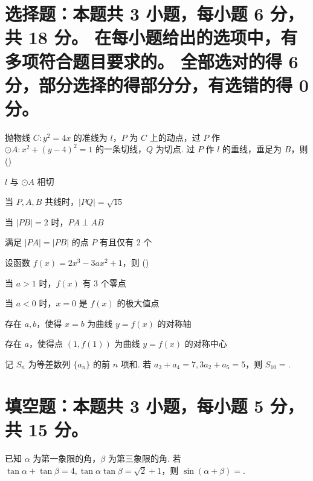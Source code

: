 \documentclass{exam-zh}
\begin{document}
\section{
  选择题：本题共 3 小题，每小题 6 分，共 18 分。
  在每小题给出的选项中，有多项符合题目要求的。
  全部选对的得 6 分，部分选择的得部分分，有选错的得 0 分。
}

\begin{question}
抛物线 $C: y^2=4x$ 的准线为 $l$，$P$ 为 $C$ 上的动点，过 $P$ 作 $\odot A: x^2+(y-4)^2=1$ 的一条切线，$Q$ 为切点. 过 $P$ 作 $l$ 的垂线，垂足为 $B$，则
(\hspace{1cm})
\begin{choices}
\item $l$ 与 $\odot A$ 相切
\item 当 $P,A,B$ 共线时，$|PQ|=\sqrt{15}$
\item 当 $|PB|=2$ 时，$PA\perp AB$
\item 满足 $|PA|=|PB|$ 的点 $P$ 有且仅有 2 个
\end{choices}
\end{question}

\begin{question}
设函数 $f(x)=2x^3-3ax^2+1$，则
(\hspace{1cm})
\begin{choices}
\item 当 $a>1$ 时，$f(x)$ 有 3 个零点
\item 当 $a<0$ 时，$x=0$ 是 $f(x)$ 的极大值点
\item 存在 $a, b$，使得 $x=b$ 为曲线 $y=f(x)$ 的对称轴
\item 存在 $a$，使得点 $(1, f(1))$ 为曲线 $y=f(x)$ 的对称中心
\end{choices}
\end{question}

\begin{question}
记 $S_n$ 为等差数列 $\{a_n\}$ 的前 $n$ 项和. 若 $a_3+a_4=7, 3a_2+a_5=5$，则 $S_{10}=$\underline{\hspace{4em}}.
\end{question}

\section{填空题：本题共 3 小题，每小题 5 分，共 15 分。}

\begin{question}
已知 $\alpha$ 为第一象限的角，$\beta$ 为第三象限的角. 若 $\tan\alpha+\tan\beta=4, \tan\alpha\tan\beta=\sqrt{2}+1$，则 $\sin(\alpha+\beta)=$\underline{\hspace{4em}}.
\end{question}
\end{document}

